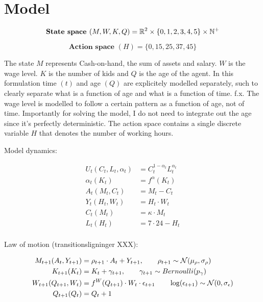 \section{Model}

\begin{equation}
    \textbf{State space } (M, W, K, Q) = \mathbb{R}^{2} \times \{0, 1, 2, 3, 4, 5\} \times \mathbb{N}^{+}
\end{equation}

\begin{equation}
    \textbf{Action space } (H) = \{0, 15, 25, 37, 45\}
\end{equation}

The state $M$ represents Cash-on-hand, the sum of assets and salary. $W$ is the wage level. $K$ is the number of kids and $Q$ is the age of the agent. In this formulation time $(t)$ and age $(Q)$ are explicitely modelled separately, such to clearly separate what is a function of age and what is a function of time. f.x. The wage level is modelled to follow a certain pattern as a function of age, not of time. Importantly for solving the model, I do not need to integrate out the age since it's perfectly deterministic. The action space contains a single discrete variable $H$ that denotes the number of working hours.


Model dynamics:

\begin{align}
    U_t (C_t, L_t, \alpha_t) &= C_t^{1-\alpha_t}L_t^{\alpha_t} \label{eq:utility_v1}\\
    \alpha_t (K_t) &= f^{\alpha}(K_t) \label{eq:alpha_v1}\\
    A_t (M_t, C_t) &= M_t - C_t \label{eq:assets_v1}\\
    Y_t ( H_t, W_t) &= H_t \cdot W_t \label{eq:salary_v1}\\
    C_t (M_t) &= \kappa \cdot M_t \label{eq:consumption_v1}\\
    L_t(H_t) &= 7 \cdot 24 - H_t \label{eq:leisure_v1}\\
\end{align}

Law of motion (transitionsligninger XXX):

\begin{align}
    M_{t+1}(A_t, Y_{t+1}) &= \rho_{t+1} \cdot A_t + Y_{t+1}, \qquad \rho_{t+1} \sim \mathcal{N}(\mu_{\rho}, \sigma_{\rho}) \label{eq:cash_on_hand_v1} \\
    K_{t+1} (K_t) &= K_t + \gamma_{t+1}, \qquad \gamma_{t+1} \sim Bernoulli(p_{\gamma}) \label{eq:kids_v1}\\
    W_{t+1} (Q_{t+1}, W_{t}) &= f^{W}(Q_{t+1}) \cdot W_t \cdot \epsilon_{t+1} \qquad \log (\epsilon_{t+1} ) \sim \mathcal{N}(0, \sigma_{\epsilon}) \label{eq:wage_v1}\\
    Q_{t+1} (Q_t)&= Q_t + 1 \label{eq:age_v1}
\end{align}

